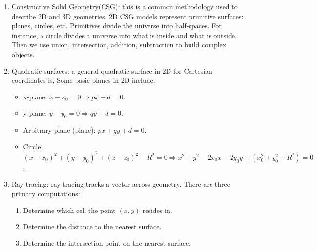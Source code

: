 \documentclass{school-22.211-notes}
\begin{document}
\clearpage
{}
\begin{enumerate}
\item Constructive Solid Geometry(CSG): this is a common methodology used to describe 2D and 3D geometries. 2D CSG models represent primitive surfaces: planes, circles, etc. Primitives divide the universe into half-spaces. For instance, a circle divides a universe into what is inside and what is outside. Then we use union, intersection, addition, subtraction to build complex objects. 


\item Quadratic surfaces: a general quadratic surface in 2D for Cartesian coordinates is, 
  Some basic planes in 2D include: 
  \begin{itemize}
    \item x-plane: $x-x_0 = 0 \Rightarrow px + d =0$. 
    \item y-plane: $y-y_0 = 0 \Rightarrow qy + d = 0$. 
    \item Arbitrary plane (plane): $px + qy + d =0$. 
    \item Circle: $(x-x_0)^2 + (y-y_0)^2 + (z-z_0)^2 - R^2  = 0 \Rightarrow x^2 + y^2 - 2x_0 x - 2y_0 y + (x_0^2 + y_0^2 - R^2) = 0$. 
  \end{itemize}

\item Ray tracing: ray tracing tracks a vector across geometry. There are three primary computations: 
  \begin{enumerate}
    \item Determine which cell the point $(x,y)$ resides in. 
    \item Determine the distance to the nearest surface. 
    \item Determine the intersection point on the nearest surface. 
  \end{enumerate}
\end{enumerate}











\clearpage
\end{document}
